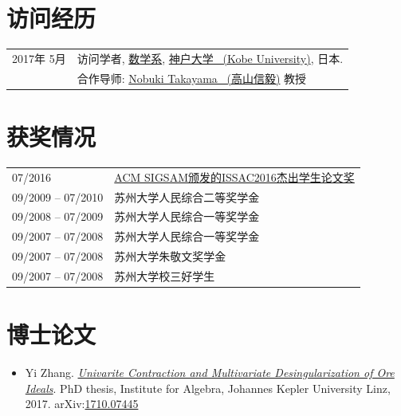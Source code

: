 \documentclass[a4paper,12pt]{article}
\begin{document}
\begin{CJK*}{UTF8}{gbsn}
\section*{\Large{访问经历}}
\begin{tabular}{@{}p{1.0in}p{4.5in}}
2017年 5月               & 访问学者, 
                        \href{http://www.math.kobe-u.ac.jp/}{数学系},
                        \href{http://www.kobe-u.ac.jp/en/}{神户大学 \ (Kobe University)}, 日本. \\                       
                        & 合作导师: \href{http://www.math.kobe-u.ac.jp/home-j/takayama-e.html}{Nobuki Takayama \ (高山信毅)} 教授\\
\end{tabular}

\section*{\Large{获奖情况}}
\begin{tabular}{@{}p{1.4in}p{4in}}
07/2016               & \href{https://www.sigsam.org/Awards/ISSACAwards.html}{ACM SIGSAM颁发的ISSAC2016杰出学生论文奖} \\
09/2009 -- 07/2010    & 苏州大学人民综合二等奖学金\\
09/2008 -- 07/2009    & 苏州大学人民综合一等奖学金 \\
09/2007 -- 07/2008    & 苏州大学人民综合一等奖学金 \\ 
09/2007 -- 07/2008    & 苏州大学朱敬文奖学金 \\
09/2007 -- 07/2008    & 苏州大学校三好学生
\end{tabular}


\section*{\Large{博士论文}}
\begin{itemize}
 \item Yi Zhang. \href{https://yzhang1616.github.io/yzhang_PhDthesis_final.pdf}{{\em Univarite 
                Contraction and Multivariate Desingularization of Ore Ideals}}. 
                PhD thesis, Institute for Algebra, Johannes Kepler University Linz, 2017. 
                arXiv:\href{https://arxiv.org/abs/1710.07445}{1710.07445}
\end{itemize}


\end{CJK*}
\end{document}
